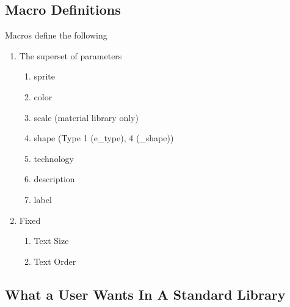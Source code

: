 \documentclass[letterpaper,10pt,english]{sphinxmanual}
\begin{document}
\subsection{Macro Definitions}
\label{\detokenize{Stdlib/stdlibRequirements:macro-definitions}}
Macros define the following
\begin{enumerate}
%
\item {} 
The superset of parameters
\begin{enumerate}
%
\item {} 
sprite

\item {} 
color

\item {} 
scale (material library only)

\item {} 
shape (Type 1 (e\_type), 4 (\_shape))

\item {} 
technology

\item {} 
description

\item {} 
label

\end{enumerate}

\item {} 
Fixed
\begin{enumerate}
%
\item {} 
Text Size

\item {} 
Text Order

\end{enumerate}

\end{enumerate}


\subsection{What a User Wants In A Standard Library}
\label{\detokenize{Stdlib/stdlibRequirements:what-a-user-wants-in-a-standard-library}}
\end{document}
